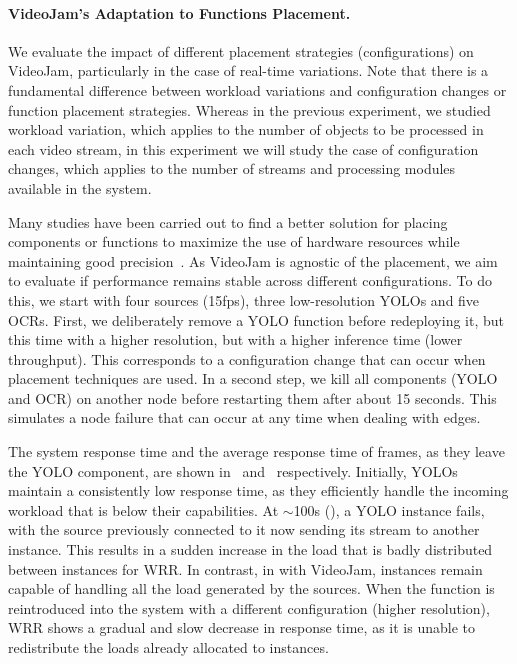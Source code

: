 \paragraph{VideoJam's Adaptation to Functions Placement.}
We evaluate the impact of different placement strategies (configurations) on VideoJam, particularly in the case of real-time variations. Note that there is a fundamental difference between workload variations and configuration changes or function placement strategies. Whereas in the previous experiment, we studied workload variation, which applies to the number of objects to be processed in each video stream, in this experiment we will study the case of configuration changes, which applies to the number of streams and processing modules available in the system.

Many studies have been carried out to find a better solution for placing components or functions to maximize the use of hardware resources while maintaining good precision~\cite{201465videostorm,hung2018videoedge}. As VideoJam is agnostic of the placement, we aim to evaluate if performance remains stable across different configurations. To do this, we start with four sources (15fps), three low-resolution YOLOs and five OCRs. First, we deliberately remove a YOLO function before redeploying it, but this time with a higher resolution, but with a higher inference time (lower throughput). This corresponds to a configuration change that can occur when placement techniques are used. In a second step, we kill all components (YOLO and OCR) on another node before restarting them after about 15 seconds. This simulates a node failure that can occur at any time when dealing with edges.

The system response time and the average response time of frames, as they leave the YOLO component, are shown in~ and~ respectively. Initially, YOLOs maintain a consistently low response time, as they efficiently handle the incoming workload that is below their capabilities. At $\sim$100s (), a YOLO instance fails, with the source previously connected to it now sending its stream to another instance. This results in a sudden increase in the load that is badly distributed between instances for WRR. In contrast, in with VideoJam, instances remain capable of handling all the load generated by the sources. When the function is reintroduced into the system with a different configuration (higher resolution), WRR shows a gradual and slow decrease in response time, as it is unable to redistribute the loads already allocated to instances. 

